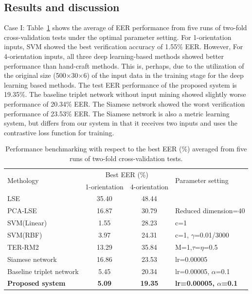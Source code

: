 \documentclass{sig-alternate-05-2015}
\begin{document}
\subsection{Results and discussion}

Case I: Table~\ref{tab3} shows the average of EER performance from five runs of two-fold cross-validation tests under the optimal parameter setting. For 1-orientation inputs, SVM showed the best verification accuracy of 1.55\% EER. However, For 4-orientation inputs, all three deep learning-based methods showed better performance than hand-craft methods. This is, perhaps, due to the utilization of the original size (500$\times$30$\times$6) of the input data in the training stage for the deep learning based methods. The test EER performance of the proposed system is 19.35\%. The baseline triplet network without input mining showed slightly worse performance of 20.34\% EER. The Siamese network showed the worst verification performance of 23.53\% EER. The Siamese network is also a metric learning system, but differs from our system in that it receives two inputs and uses the contrastive loss function for training. 
\begin{table}
\centering
    \caption{Performance benchmarking with respect to the best EER (\%) averaged from five runs of two-fold cross-validation tests.}
    \label{tab3}
    \begin{tabular}{|l|c|c|l|} \hline
    \multirow{2}{*}{Methology} & \multicolumn{2}{|c|}{Best EER (\%)} & \multirow{2}{*}{Parameter setting} \\ \cline{2-3}           & 1-orientation & 4-orientation     &    \\ \hline
    LSE                                    & 35.40 & 48.44           &                           \\  \hline
    PCA-LSE                                & 16.87 & 30.79           & Reduced dimension=40        \\  \hline
    SVM(Linear)                            & 1.55 & 28.23            & c=1                        \\  \hline
    SVM(RBF)                               & 3.97 & 24.31            & c=1, $\gamma$=0.01/3000    \\  \hline
    TER-RM2                                & 13.29 & 35.84          & M=1,$\tau$=$\eta$=0.5      \\ \hline
    Siamese network                        & 16.86 & 23.53           & lr=0.00005                 \\  \hline
    Baseline triplet network               & 5.45 & 20.34           & lr=0.00005, $\alpha$=0.1   \\  \hline
    \textbf{Proposed system}               & \textbf{5.09} & \textbf{19.35}           & \textbf{lr=0.00005, $\alpha$=0.1}   \\ \hline
    \end{tabular}
\end{table}
\end{document}
